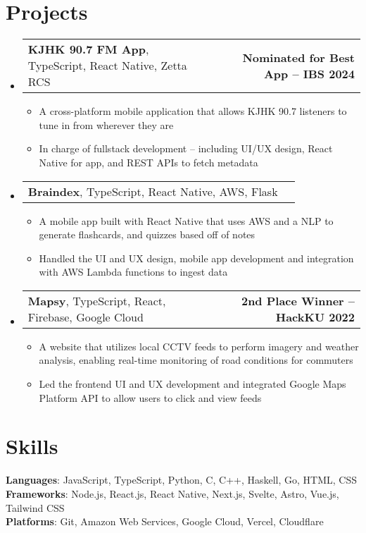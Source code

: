 \documentclass[letter,11pt]{article}
\makeatletter
\newcommand{\resumeItem}[1]{
	\item \small{{#1 \vspace{-2pt}}}
}
\newcommand{\resumeProjectHeading}[2]{
    \item
    \begin{tabular*}{1.001\textwidth}{l@{\extracolsep{\fill}}r}
		\small#1 & \textbf{\small #2}\\
    \end{tabular*}\vspace{-7pt}
}
\newcommand{\resumeSubHeadingListStart}{\begin{itemize}[leftmargin=0.0in, label={}]}
\newcommand{\resumeSubHeadingListEnd}{\end{itemize}}
\newcommand{\resumeItemListStart}{\begin{itemize}[leftmargin=0.5cm]}
\newcommand{\resumeItemListEnd}{\end{itemize}\vspace{-5pt}}
\makeatother
\begin{document}
\section{Projects}
    \vspace{-5pt}
	\resumeSubHeadingListStart
		\resumeProjectHeading{\textbf{KJHK 90.7 FM App}, {TypeScript, React Native, Zetta RCS}}{Nominated for Best App -- IBS 2024}
			\resumeItemListStart
				\resumeItem{A cross-platform mobile application that allows KJHK 90.7 listeners to tune in from wherever they are}
				\resumeItem{In charge of fullstack development -- including UI/UX design, React Native for app, and REST APIs to fetch metadata}
			\resumeItemListEnd
			\vspace{-15pt}
		\resumeProjectHeading{\textbf{Braindex}, {TypeScript, React Native, AWS, Flask}}{}
			\resumeItemListStart
				\resumeItem{A mobile app built with React Native that uses AWS and a NLP to generate flashcards, and quizzes based off of notes}
				\resumeItem{Handled the UI and UX design, mobile app development and integration with AWS Lambda functions to ingest data}
			\resumeItemListEnd
			\vspace{-15pt}
		\resumeProjectHeading{\textbf{Mapsy}, {TypeScript, React, Firebase, Google Cloud}}{2nd Place Winner -- HackKU 2022}
			\resumeItemListStart
				\resumeItem{A website that utilizes local CCTV feeds to perform imagery and weather analysis, enabling real-time monitoring of road conditions for commuters}
				\resumeItem{Led the frontend UI and UX development and integrated Google Maps Platform API to allow users to click and view feeds}
			\resumeItemListEnd
	\resumeSubHeadingListEnd
\vspace{-15pt}

\section{Skills}
	\begin{itemize}[leftmargin=0.05in, label={}]
		\small{\item{
			\textbf{Languages}{: JavaScript, TypeScript, Python, C, C++, Haskell, Go, HTML, CSS} \\
			\textbf{Frameworks}{: Node.js, React.js, React Native, Next.js, Svelte, Astro, Vue.js, Tailwind CSS} \\
			\textbf{Platforms}{: Git, Amazon Web Services, Google Cloud, Vercel, Cloudflare}
		}}
	\end{itemize}
\vspace{-15pt}
\end{document}
